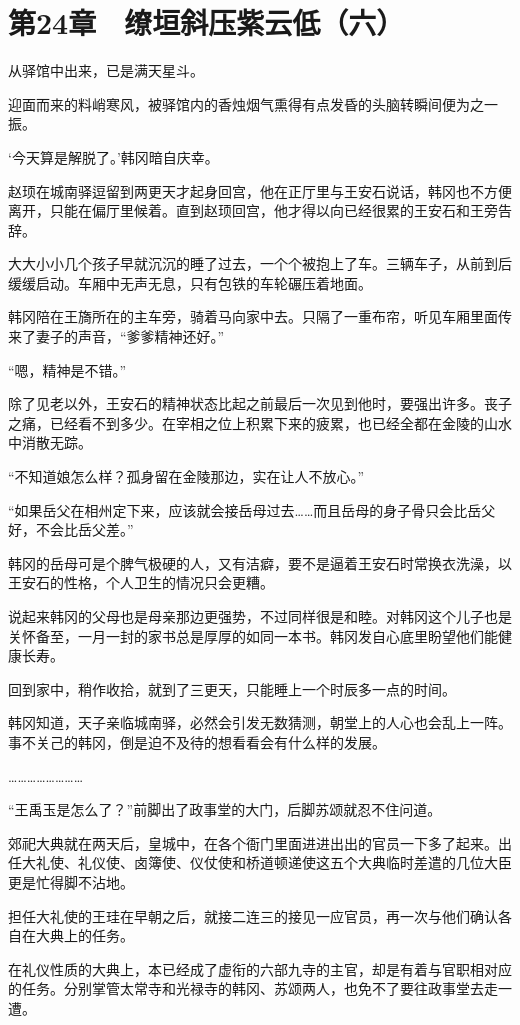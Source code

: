 \section{第24章　缭垣斜压紫云低（六）}

从驿馆中出来，已是满天星斗。

迎面而来的料峭寒风，被驿馆内的香烛烟气熏得有点发昏的头脑转瞬间便为之一振。

‘今天算是解脱了。’韩冈暗自庆幸。

赵顼在城南驿逗留到两更天才起身回宫，他在正厅里与王安石说话，韩冈也不方便离开，只能在偏厅里候着。直到赵顼回宫，他才得以向已经很累的王安石和王旁告辞。

大大小小几个孩子早就沉沉的睡了过去，一个个被抱上了车。三辆车子，从前到后缓缓启动。车厢中无声无息，只有包铁的车轮碾压着地面。

韩冈陪在王旖所在的主车旁，骑着马向家中去。只隔了一重布帘，听见车厢里面传来了妻子的声音，“爹爹精神还好。”

“嗯，精神是不错。”

除了见老以外，王安石的精神状态比起之前最后一次见到他时，要强出许多。丧子之痛，已经看不到多少。在宰相之位上积累下来的疲累，也已经全都在金陵的山水中消散无踪。

“不知道娘怎么样？孤身留在金陵那边，实在让人不放心。”

“如果岳父在相州定下来，应该就会接岳母过去……而且岳母的身子骨只会比岳父好，不会比岳父差。”

韩冈的岳母可是个脾气极硬的人，又有洁癖，要不是逼着王安石时常换衣洗澡，以王安石的性格，个人卫生的情况只会更糟。

说起来韩冈的父母也是母亲那边更强势，不过同样很是和睦。对韩冈这个儿子也是关怀备至，一月一封的家书总是厚厚的如同一本书。韩冈发自心底里盼望他们能健康长寿。

回到家中，稍作收拾，就到了三更天，只能睡上一个时辰多一点的时间。

韩冈知道，天子亲临城南驿，必然会引发无数猜测，朝堂上的人心也会乱上一阵。事不关己的韩冈，倒是迫不及待的想看看会有什么样的发展。

……………………

“王禹玉是怎么了？”前脚出了政事堂的大门，后脚苏颂就忍不住问道。

郊祀大典就在两天后，皇城中，在各个衙门里面进进出出的官员一下多了起来。出任大礼使、礼仪使、卤簿使、仪仗使和桥道顿递使这五个大典临时差遣的几位大臣更是忙得脚不沾地。

担任大礼使的王珪在早朝之后，就接二连三的接见一应官员，再一次与他们确认各自在大典上的任务。

在礼仪性质的大典上，本已经成了虚衔的六部九寺的主官，却是有着与官职相对应的任务。分别掌管太常寺和光禄寺的韩冈、苏颂两人，也免不了要往政事堂去走一遭。

